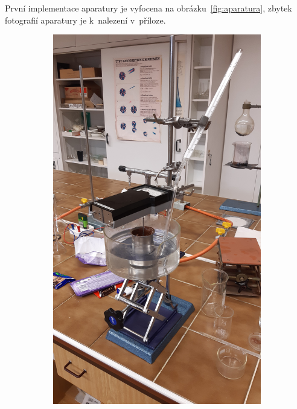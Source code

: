 \documentclass[12pt]{article}
\begin{document}
\par\noindent
První implementace aparatury je vyfocena na obrázku~\ref{fig:aparatura}, zbytek fotografií aparatury je k~nalezení v~příloze.

\begin{figure}
    \begin{subfigure}[b]{.5\textwidth}
        \includegraphics[angle = 270, width = \textwidth]{figures/aparatura_1.jpg}
    \end{subfigure}
    \hfill

\end{figure}
\end{document}
